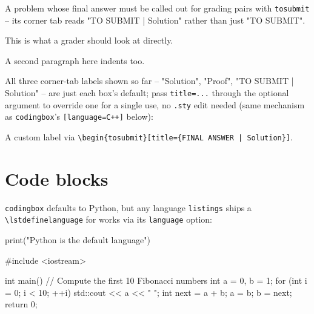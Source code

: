 \documentclass[a4paper, 10pt]{article}
\begin{document}
\begin{problem}
A problem whose final answer must be called out for grading pairs with
\verb|tosubmit| -- its corner tab reads "TO SUBMIT | Solution" rather than
just "TO SUBMIT".
\end{problem}
\begin{tosubmit}
	This is what a grader should look at directly.

	A second paragraph here indents too.
\end{tosubmit}

All three corner-tab labels shown so far -- "Solution", "Proof", "TO SUBMIT
| Solution" -- are just each box's default; pass \verb|title=...| through
the optional argument to override one for a single use, no \texttt{.sty}
edit needed (same mechanism as \verb|codingbox|'s
\verb|[language=C++]| below):
\begin{tosubmit}[title={FINAL ANSWER | Solution}]
	A custom label via \verb!\begin{tosubmit}[title={FINAL ANSWER | Solution}]!.
\end{tosubmit}

\section{Code blocks}
\verb|codingbox| defaults to Python, but any language \texttt{listings} ships
a \verb|\lstdefinelanguage| for works via its \texttt{language} option:
\begin{codingbox}
    print("Python is the default language")
\end{codingbox}
\begin{codingbox}[language=C++]
#include <iostream>

int main() {
    // Compute the first 10 Fibonacci numbers
    int a = 0, b = 1;
    for (int i = 0; i < 10; ++i) {
        std::cout << a << " ";
        int next = a + b;
        a = b;
        b = next;
    }
    return 0;
}
\end{codingbox}
\end{document}
